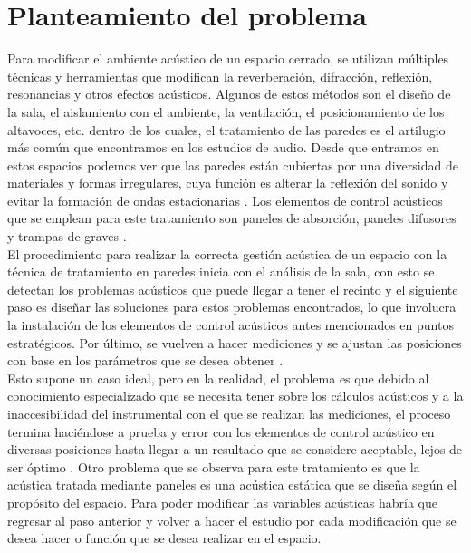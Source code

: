 \section*{Planteamiento del problema}
Para modificar el ambiente acústico de un espacio cerrado, se utilizan múltiples técnicas y herramientas que modifican la reverberación, difracción, reflexión, resonancias y otros efectos acústicos. Algunos de estos métodos son el diseño de la sala, el aislamiento con el ambiente, la ventilación, el posicionamiento de los altavoces, etc. \cite{E-Home} dentro de los cuales, el tratamiento de las paredes es el artilugio más común que encontramos en los estudios de audio. Desde que entramos en estos espacios podemos ver que las paredes están cubiertas por una diversidad de materiales y formas irregulares, cuya función es alterar la reflexión del sonido y evitar la formación de ondas estacionarias \cite{Albano}. Los elementos de control acústicos que se emplean para este tratamiento son paneles de absorción, paneles difusores y trampas de graves \cite{Ervine}.
\\
El procedimiento para realizar la correcta gestión acústica de un espacio con la técnica de tratamiento en paredes inicia con el análisis de la sala, con esto se detectan los problemas acústicos que puede llegar a tener el recinto y el siguiente paso es diseñar las soluciones para estos problemas encontrados, lo que involucra la instalación de los elementos de control acústicos antes mencionados en puntos estratégicos. Por último, se vuelven a hacer mediciones y se ajustan las posiciones con base en los parámetros que se desea obtener \cite{Irwin}. 
\\
Esto supone un caso ideal, pero en la realidad, el problema es que debido al conocimiento especializado que se necesita tener sobre los cálculos acústicos y a la inaccesibilidad del instrumental con el que se realizan las mediciones, el proceso termina haciéndose a prueba y error con los elementos de control acústico en diversas posiciones hasta llegar a un resultado que se considere aceptable, lejos de ser óptimo \cite{E-Home}. Otro problema que se observa para este tratamiento es que la acústica tratada mediante paneles es una acústica estática que se diseña según el propósito del espacio. Para poder modificar las variables acústicas habría que regresar al paso anterior y volver a hacer el estudio por cada modificación que se desea hacer o función que se desea realizar en el espacio. 
\\
